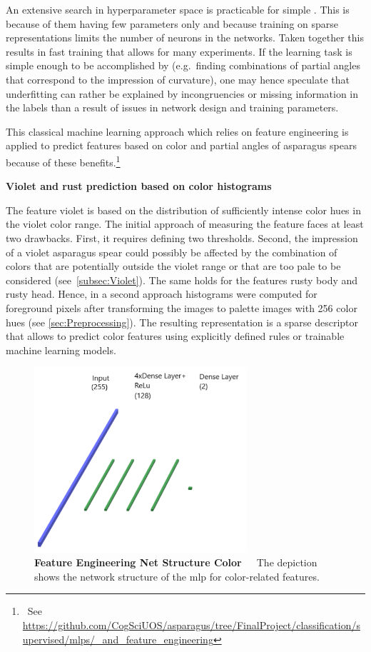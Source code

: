 An extensive search in hyperparameter space is practicable for simple . This is because of them having few parameters only and because training on sparse representations limits the number of neurons in the networks. Taken together this results in fast training that allows for many experiments. If the learning task is simple enough to be accomplished by  (e.g.\ finding combinations of partial angles that correspond to the impression of curvature), one may hence speculate that underfitting can rather be explained by incongruencies or missing information in the labels than a result of issues in network design and training parameters. 

This classical machine learning approach which relies on feature engineering is applied to predict features based on color and partial angles of asparagus spears because of these benefits.\footnote{~See \url{https://github.com/CogSciUOS/asparagus/tree/FinalProject/classification/supervised/mlps/\_and\_feature\_engineering}}

\bigskip
\textbf{Violet and rust prediction based on color histograms} 

The feature violet is based on the distribution of sufficiently intense color hues in the violet color range. The initial approach of measuring the feature faces at least two drawbacks. First, it requires defining two thresholds. Second, the impression of a violet asparagus spear could possibly be affected by the combination of colors that are potentially outside the violet range or that are too pale to be considered (see~\autoref{subsec:Violet}). The same holds for the features rusty body and rusty head. Hence, in a second approach histograms were computed for foreground pixels after transforming the images to palette images with 256 color hues (see \autoref{sec:Preprocessing}). The resulting representation is a sparse descriptor that allows to predict color features using explicitly defined rules or trainable machine learning models.

\begin{figure}[!htb]
	\centering
	\includegraphics[width=0.70\textwidth]{Figures/chapter04/fe_color.png}
	\decoRule
	\caption[Feature Engineering Net Structure Color]{\textbf{Feature Engineering Net Structure Color}~~~The depiction shows the network structure of the \acrshort{mlp} for color-related features.}
	\label{fig:FeatureEngineeringNetStructureColor}
\end{figure}

